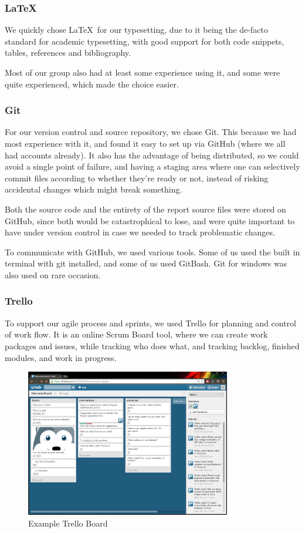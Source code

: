 \subsubsection{\LaTeX}
We quickly chose \LaTeX \ for our typesetting, due to it being the de-facto standard for academic typesetting, with good support for both code snippets, tables, references and bibliography.

Most of our group also had at least some experience using it, and some were quite experienced, which made the choice easier.

\subsubsection{Git}
For our version control and source repository, we chose Git. This because we had most experience with it, and found it easy to set up via GitHub (where we all had accounts already). It also has the advantage of being distributed, so we could avoid a single point of failure, and having a staging area where one can selectively commit files according to whether they're ready or not, instead of risking accidental changes which might break something.

Both the source code and the entirety of the report source files were stored on GitHub, since both would be catastrophical to lose, and were quite important to have under version control in case we needed to track problematic changes.

To communicate with GitHub, we used various tools. Some of us used the built in terminal with git installed, and some of us used GitBash. Git for windows was also used on rare occasion.

\subsubsection{Trello}\label{Trello}
To support our agile process and sprints, we used Trello for planning and control of work flow. It is an online Scrum Board tool, where we can create work packages and issues, while tracking who does what, and tracking backlog, finished modules, and work in progress.

\begin{figure}[H]
\centering
\includegraphics[width=0.8\textwidth]{images/Trello.png}
\caption{Example Trello Board}
\label{fig:Trello}
\end{figure}

